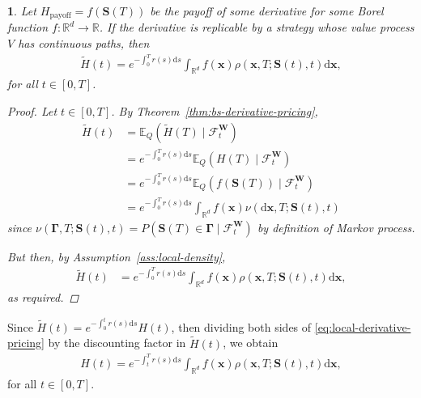 \documentclass[english]{article}
\numberwithin{equation}{section}
\numberwithin{figure}{section}
\theoremstyle{bolddescit}
\newtheorem{theorem}{\protect\theoremname}[section]
\theoremstyle{definition}
\theoremstyle{definition}
\theoremstyle{plain}
\theoremstyle{plain}
\theoremstyle{bolddesc}
\theoremstyle{plain}
\theoremstyle{remark}
\providecommand{\theoremname}{Theorem}
\begin{document}
\begin{theorem}\label{thm:local-derivative-pricing}
  Let $H_\text{payoff} = f(\mathbf{S}(T))$ be the payoff of some derivative for some Borel function $f : \mathbb{R}^d \to \mathbb{R}$.
  If the derivative is replicable by a strategy whose value process $V$ has continuous paths, then
  \begin{align}\label{eq:local-derivative-pricing}
    \widetilde{H}(t) = e^{-\int_0^T r(s) \mathrm{d}s} \int_{\mathbb{R}^d} f(\mathbf{x}) \rho(\mathbf{x},T;\mathbf{S}(t),t) \mathrm{d}\mathbf{x},
  \end{align}
  for all $t \in [0,T]$.

  \begin{proof}
    Let $t \in [0,T]$. By Theorem~\ref{thm:bs-derivative-pricing},
    \begin{align*}
      \widetilde{H}(t)
      &= \mathbb{E}_Q(\widetilde{H}(T) \mid \mathcal{F}^\mathbf{W}_t)\\
      &= e^{-\int_0^T r(s) \mathrm{d}s} \mathbb{E}_Q(H(T) \mid \mathcal{F}^\mathbf{W}_t) \tag{$r$ is deterministic}\\
      &= e^{-\int_0^T r(s) \mathrm{d}s} \mathbb{E}_Q(f(\mathbf{S}(T)) \mid \mathcal{F}^\mathbf{W}_t)\\
      &= e^{-\int_0^T r(s) \mathrm{d}s} \int_{\mathbb{R}^d} f(\mathbf{x}) \nu(\mathrm{d}\mathbf{x},T;\mathbf{S}(t),t)
    \end{align*}
    since $\nu(\mathbf{\Gamma},T;\mathbf{S}(t),t) = P(\mathbf{S}(T) \in \mathbf{\Gamma} \mid \mathcal{F}^\mathbf{W}_t)$ by definition of Markov process.

    But then, by Assumption~\ref{ass:local-density},
    \begin{align*}
      \widetilde{H}(t)
      &= e^{-\int_0^T r(s) \mathrm{d}s} \int_{\mathbb{R}^d} f(\mathbf{x}) \rho(\mathbf{x},T;\mathbf{S}(t),t) \mathrm{d}\mathbf{x},
    \end{align*}
    as required.
  \end{proof}
\end{theorem}

Since $\widetilde{H}(t) = e^{-\int_0^t r(s) \mathrm{d}s} H(t)$, then dividing both sides of \eqref{eq:local-derivative-pricing} by the discounting factor in $\widetilde{H}(t)$, we obtain
\begin{align*}
  H(t) = e^{-\int_t^T r(s) \mathrm{d}s} \int_{\mathbb{R}^d} f(\mathbf{x}) \rho(\mathbf{x},T;\mathbf{S}(t),t) \mathrm{d}\mathbf{x},
\end{align*}
for all $t \in [0,T]$.
\end{document}
